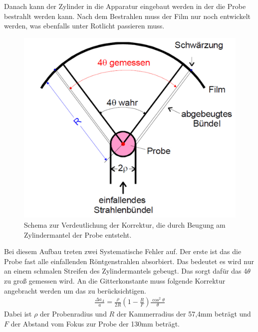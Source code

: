 Danach kann der Zylinder in die Apparatur eingebaut werden in der die Probe bestrahlt werden kann.
Nach dem Bestrahlen muss der Film nur noch entwickelt werden, was ebenfalls unter Rotlicht passieren muss.
\begin{figure}[h!]
	\centering
	\includegraphics[scale=0.4]{../Grafiken/ErsteKorrektur.pdf}
	\caption{Schema zur Verdeutlichung der Korrektur, die durch Beugung am Zylindermantel der Probe entsteht\cite{V41}.}
\end{figure}
Bei diesem Aufbau treten zwei Systematische Fehler auf. Der erste ist das die Probe fast alle einfallenden Röntgenstrahlen absorbiert. Das bedeutet es wird nur an einem schmalen Streifen des Zylindermantels gebeugt. Das sorgt dafür das 4$\theta$ zu groß gemessen wird. An die Gitterkonstante muss folgende Korrektur angebracht werden um das zu berücksichtigen.
\begin{align}
	\frac{\Delta a_A}{a}=\frac{\rho}{2R}\left(1-\frac{R}{F}\right)\frac{\cos^2\theta}{\theta}
\end{align}
Dabei ist $\rho$ der Probenradius und $R$ der Kammerradius der 57,4mm beträgt und $F$ der Abstand vom Fokus zur Probe der 130mm beträgt.\\
